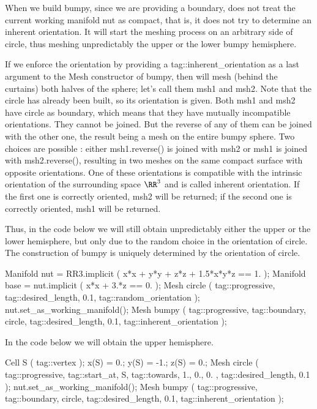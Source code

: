 When we build {\codett bumpy}, since we are providing a boundary, {\maniFEM} does not treat
the current working manifold {\codett nut} as compact, that is, it does not try to determine an
inherent orientation.
It will start the meshing process on an arbitrary side of {\codett circle}, thus meshing
unpredictably the upper or the lower {\codett bumpy} hemisphere.

If we enforce the orientation by providing a {\codett tag::inherent\_orientation} as a last
argument to the {\codett Mesh} constructor of {\codett bumpy}, then {\maniFEM} will mesh
(behind the curtains) both halves of the sphere; let's call them {\codett msh1} and {\codett msh2}.
Note that the {\codett circle} has already been built, so its orientation is given.
Both {\codett msh1} and {\codett msh2} have {\codett circle} as boundary,
which means that they have mutually incompatible orientations.
They cannot be {\codett join}ed.
But the reverse of any of them can be {\codett join}ed with the other one, the result being a
mesh on the entire bumpy sphere.
Two choices are possible : either {\codett msh1.reverse()} is {\codett join}ed with {\codett msh2}
or {\codett msh1} is {\codett join}ed with {\codett msh2.reverse()}, resulting in two meshes on
the same compact surface with opposite orientations.
One of these orientations is compatible with the intrinsic orientation of the surrounding space
$ \RR^3 $ and is called inherent orientation.
If the first one is correctly oriented, {\codett msh2} will be returned;
if the second one is correctly oriented, {\codett msh1} will be returned.

Thus, in the code below we will still obtain unpredictably either the upper or the lower
hemisphere, but only due to the random choice in the orientation of {\codett circle}.
The construction of {\codett bumpy} is uniquely determined by the orientation of {\codett circle}.

\verbatim
   Manifold nut = RR3.implicit ( x*x + y*y + z*z + 1.5*x*y*z == 1. );
   Manifold base = nut.implicit ( x*x + 3.*z == 0. );
   Mesh circle
      ( tag::progressive, tag::desired_length, 0.1, tag::random_orientation );
   nut.set_as_working_manifold();
   Mesh bumpy ( tag::progressive, tag::boundary, circle,
                tag::desired_length, 0.1, tag::inherent_orientation );
\endverbatim

In the code below we will obtain the upper hemisphere.

\verbatim
   Cell S ( tag::vertex );
   x(S) =  0.;  y(S) = -1.;  z(S) =  0.;
   Mesh circle ( tag::progressive, tag::start_at, S, tag::towards, { 1., 0., 0. },
                 tag::desired_length, 0.1                                          );
   nut.set_as_working_manifold();
   Mesh bumpy ( tag::progressive, tag::boundary, circle,
                tag::desired_length, 0.1, tag::inherent_orientation );
\endverbatim

